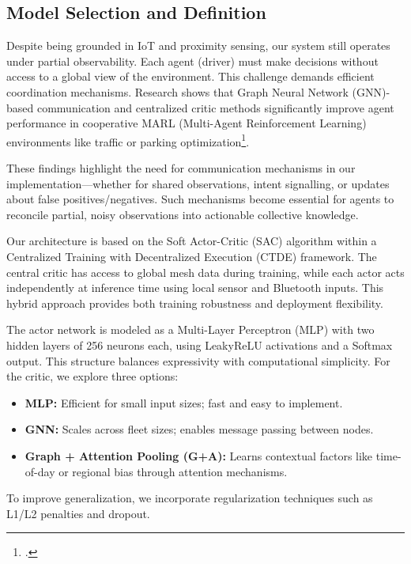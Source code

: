 \subsection{Model Selection and Definition}
Despite being grounded in IoT and proximity sensing, our system still operates under partial observability. Each agent (driver) must make decisions without access to a global view of the environment. This challenge demands efficient coordination mechanisms. Research shows that Graph Neural Network (GNN)-based communication and centralized critic methods significantly improve agent performance in cooperative MARL (Multi-Agent Reinforcement Learning) environments like traffic or parking optimization\footcite{article}.

These findings highlight the need for communication mechanisms in our implementation—whether for shared observations, intent signalling, or updates about false positives/negatives. Such mechanisms become essential for agents to reconcile partial, noisy observations into actionable collective knowledge.

Our architecture is based on the Soft Actor-Critic (SAC) algorithm within a Centralized Training with Decentralized Execution (CTDE) framework. The central critic has access to global mesh data during training, while each actor acts independently at inference time using local sensor and Bluetooth inputs. This hybrid approach provides both training robustness and deployment flexibility.

The actor network is modeled as a Multi-Layer Perceptron (MLP) with two hidden layers of 256 neurons each, using LeakyReLU activations and a Softmax output. This structure balances expressivity with computational simplicity. For the critic, we explore three options:
\begin{itemize}
    \item \textbf{MLP:} Efficient for small input sizes; fast and easy to implement.
    \item \textbf{GNN:} Scales across fleet sizes; enables message passing between nodes.
    \item \textbf{Graph + Attention Pooling (G+A):} Learns contextual factors like time-of-day or regional bias through attention mechanisms.
\end{itemize}
To improve generalization, we incorporate regularization techniques such as L1/L2 penalties and dropout.

